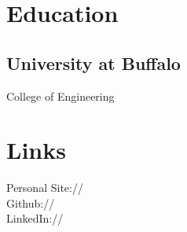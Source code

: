 \documentclass[]{deedy-resume-openfont}
\begin{document}
%
%
\lastupdated

%
%



%
%

\begin{minipage}[t]{0.33\textwidth} 


\section{Education} 

\subsection{University at Buffalo}

College of Engineering \\
\sectionsep


\section{Links}
Personal Site:// \href{https://alexander.directory}{} \\
Github:// \href{https://github.com/xanderrman}{} \\
LinkedIn://  \href{https://www.linkedin.com/in/alex-anelli}{} \\
\sectionsep



\end{minipage}
\end{document}
